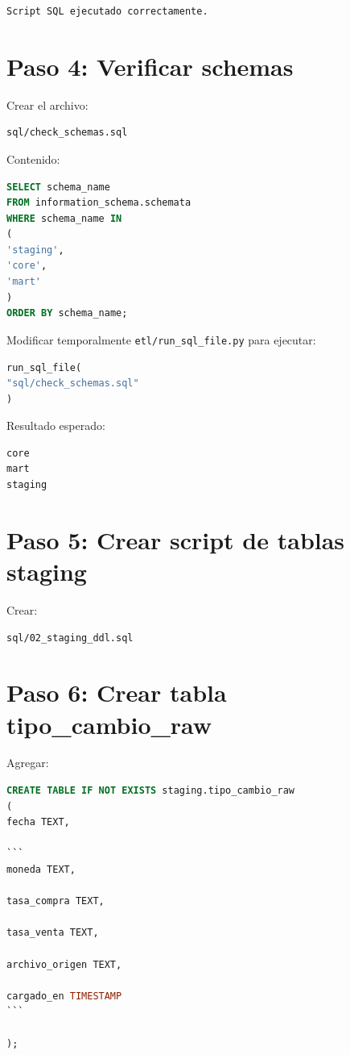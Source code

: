 \begin{verbatim}
Script SQL ejecutado correctamente.
\end{verbatim}

\section{Paso 4: Verificar schemas}

Crear el archivo:

\begin{verbatim}
sql/check_schemas.sql
\end{verbatim}

Contenido:

\begin{lstlisting}[language=SQL]
SELECT schema_name
FROM information_schema.schemata
WHERE schema_name IN
(
'staging',
'core',
'mart'
)
ORDER BY schema_name;
\end{lstlisting}

Modificar temporalmente \texttt{etl/run_sql_file.py} para ejecutar:

\begin{lstlisting}[language=Python]
run_sql_file(
"sql/check_schemas.sql"
)
\end{lstlisting}

Resultado esperado:

\begin{verbatim}
core
mart
staging
\end{verbatim}

\section{Paso 5: Crear script de tablas staging}

Crear:

\begin{verbatim}
sql/02_staging_ddl.sql
\end{verbatim}

\section{Paso 6: Crear tabla tipo_cambio_raw}

Agregar:

\begin{lstlisting}[language=SQL]
CREATE TABLE IF NOT EXISTS staging.tipo_cambio_raw
(
fecha TEXT,

```
moneda TEXT,

tasa_compra TEXT,

tasa_venta TEXT,

archivo_origen TEXT,

cargado_en TIMESTAMP
```

);
\end{lstlisting}

